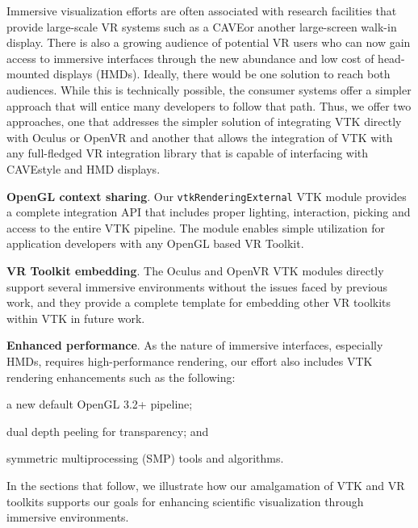 Immersive visualization efforts are often associated with research
facilities that provide large-scale VR systems such as a CAVE\texttrademark\thinspace or
another large-screen walk-in display.
There is also a growing audience of potential VR users who can now
gain access to immersive interfaces through the new abundance and low cost
of head-mounted displays (HMDs).
Ideally, there would be one solution to reach both audiences. While this is
technically possible, the consumer systems offer a simpler
approach that will entice many developers to follow that path.
Thus, we offer two approaches, one that addresses the simpler solution
of integrating VTK directly with Oculus or OpenVR and another that allows the integration of VTK with
any full-fledged VR integration library that is capable of interfacing
with CAVE\texttrademark\thinspace style and HMD displays.

\textbf{OpenGL context sharing}.
Our \texttt{vtkRenderingExternal} VTK module provides a complete integration API
that includes proper lighting, interaction, picking and access to the entire
VTK pipeline.
The module enables simple utilization for application developers with
any OpenGL based VR Toolkit.

\textbf{VR Toolkit embedding}.
The Oculus and OpenVR VTK modules directly support several immersive environments
without the issues faced by previous work, and they provide a complete template
for embedding other VR toolkits within VTK in future work.

\textbf{Enhanced performance}.
As the nature of immersive interfaces, especially HMDs, requires
high-performance rendering, our effort also includes VTK rendering enhancements
such as the following:

\begin{compactitem}
\item a new default OpenGL 3.2+ pipeline;
\item dual depth peeling for transparency; and 
\item symmetric multiprocessing (SMP) tools and algorithms.
\end{compactitem}

In the sections that follow, we illustrate how our amalgamation of VTK and VR toolkits supports our goals for enhancing scientific visualization through immersive environments.

